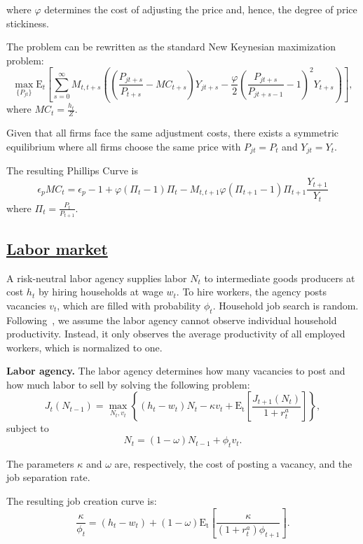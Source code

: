 \documentclass[\PathToRoot/\ProjectName]{subfiles}
\begin{document}
where $\varphi$ determines the cost of adjusting the price and, hence, the degree of price stickiness.

The problem can be rewritten as the standard New Keynesian maximization problem:
\[
  \max_{\{P_{jt}\}} \mathrm{E}_{t}\left[\sum_{s=0}^{\infty}  M_{t,t+s} \left( \left( \frac{P_{jt+s}}{P_{t+s}} - MC_{t+s}\right)Y_{jt+s} -  \frac{\varphi}{2}\left( \frac{P_{jt+s}}{P_{jt+s-1}} - 1\right)^{2} Y_{t+s} \right)\right],
\]
where $MC_{t} = \frac{h_{t}}{Z}$.

Given that all firms face the same adjustment costs, there exists a symmetric equilibrium where all firms choose the same price with $P_{jt}=P_{t}$ and $Y_{jt}=Y_{t}$.

The resulting Phillips Curve is
\[
  \epsilon_{p} MC_{t} = \epsilon_{p} - 1 + \varphi ( \Pi_{t} -1) \Pi_{t} - M_{t,t+1} \varphi (\Pi_{t+1} -1 ) \Pi_{t+1} \frac{Y_{t+1}}{Y_{t}}
\]
where $\Pi_{t} = \frac{P_{t}}{P_{t+1}}$.

\subsection{\href{https://econ-ark.github.io/HAFiscal/\#sec:hank-labor-market}{Labor market}}\label{sec:hank-labor-market}

A risk-neutral labor agency supplies labor \( N_t \) to intermediate goods producers at cost \( h_t \) by hiring households at wage \( w_t \). To hire workers, the agency posts vacancies \( v_t \), which are filled with probability \( \phi_t \). Household job search is random. Following~\cite{Bardoczy2022}, we assume the labor agency cannot observe individual household productivity. Instead, it only observes the average productivity of all employed workers, which is normalized to one.

\textbf{Labor agency.} The labor agency determines how many vacancies to post and how much labor to sell by solving the following problem:
\[
  J_{t}(N_{t-1})  = \max_{N_{t},v_{t}} \left\{( h_{t} - w_{t}) N_{t}- \kappa v_{t} + \mathrm{E_{t}}\left[ \frac{J_{t+1}(N_{t})}{1 + r^{a}_{t}}\right]\right\},
\]
subject to
\[
  N_{t} = (1-\omega)N_{t-1} + \phi_{t} v_{t}.
\]

The parameters $\kappa$ and $\omega$ are, respectively, the cost of posting a vacancy, and the job separation rate.

The resulting job creation curve is:
\[
  \frac{\kappa}{\phi_{t}}  = (h_{t} - w_{t})+  (1-\omega)\mathrm{E_{t}}\left[   \frac{\kappa}{(1+r^{a}_{t}) \phi_{t+1}} \right].
\]
\end{document}
